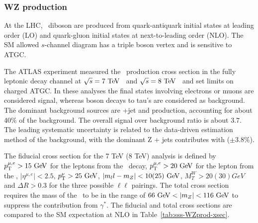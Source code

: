 \subsubsection{WZ production}

\label{sss-WZprod}

At the LHC, \WZ\ diboson are produced from quark-antiquark initial states at 
leading order (LO) and quark-gluon initial states at next-to-leading order 
(NLO). %
The SM allowed $s$-channel diagram has a triple boson vertex and is sensitive to 
ATGC.





The ATLAS experiment measured the \WZ\ production cross section in the fully 
leptonic decay channel \ll\lnu\; at $\rts = 7\TeV$~\cite{Aad:2012twa} and $\rts = 8\TeV$~\cite{Aad:2016ett} 
and set limits on charged ATGC.
In these analyses the final states involving electrons or muons are considered signal,
whereas boson decays to tau's are considered as background.  
The dominant background sources are \Zboson+jet and \ZZ production, accounting for about 40\% of 
the background. The overall signal over background ratio is about $3.7$.
The leading systematic uncertainty is related to the data-driven estimation method of the   
background, with the dominant Z + jets contributes with ($\pm3.8\%$).

The fiducial cross section for the 7 TeV (8 TeV) analysis is defined by $\pt^{\mu,e} > 15\GeV$ for the leptons from the \Zboson\ 
 decay, $\pt^{\mu,e} > 20\GeV$ for the lepton from the \Wboson, $|\eta^{\mu,e}|<2.5$, $\pt^\nu>25\GeV$,
 $|m_ll-m_Z| < 10(25)\GeV$, $M_T^W>20(30)GeV$ and $\Delta R> 0.3$ for the three possible $\ell\ell$ pairings. 
The total cross section requires the mass of the \Zboson\ to be in the range of $66\GeV < |m_Z| < 116\GeV$
to suppress the contribution from $\gamma^*$.
The fiducial and total cross sections are compared to the SM expectation at NLO in Table~\ref{tab:sss-WZprod-xsec}.

